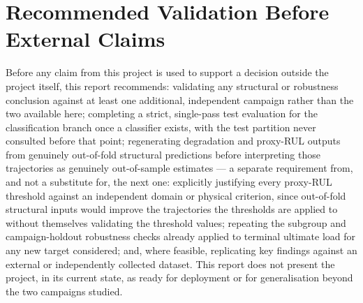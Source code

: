 \section{Recommended Validation Before External Claims}
\label{sec:status-validation}

Before any claim from this project is used to support a decision outside
the project itself, this report recommends: validating any structural or
robustness conclusion against at least one additional, independent
campaign rather than the two available here; completing a strict,
single-pass test evaluation for the classification branch once a
classifier exists, with the test partition never consulted before that
point; regenerating degradation and proxy-RUL outputs from genuinely
out-of-fold structural predictions before interpreting those trajectories
as genuinely out-of-sample estimates — a separate requirement from, and
not a substitute for, the next one: explicitly justifying every proxy-RUL
threshold against an independent domain or physical criterion, since
out-of-fold structural inputs would improve the trajectories the
thresholds are applied to without themselves validating the threshold
values; repeating the subgroup and campaign-holdout
robustness checks already applied to terminal ultimate load for any new
target considered; and, where feasible, replicating key findings against
an external or independently collected dataset. This report does not
present the project, in its current state, as ready for deployment or for
generalisation beyond the two campaigns studied.
